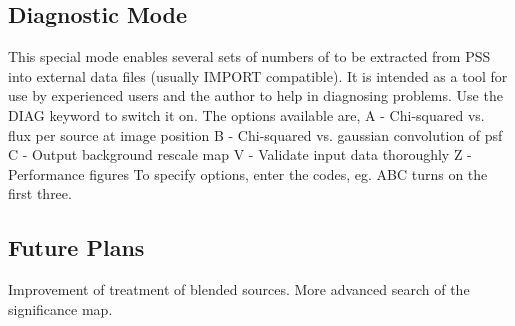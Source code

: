 \documentclass{book}
\renewcommand{\_}{{\tt\char'137}}     %
\begin{document}
\subsection{Diagnostic Mode}
This special mode enables several sets of numbers of to be extracted
from PSS into external data files (usually IMPORT compatible). It is
intended as a tool for use by experienced users and the author to
help in diagnosing problems. Use the DIAG keyword to switch it on.
The options available are,
A - Chi-squared vs. flux per source at image position
B - Chi-squared vs. gaussian convolution of psf
C - Output background rescale map
V - Validate input data thoroughly
Z - Performance figures
To specify options, enter the codes, eg. ABC turns on the first three.
\subsection{Future Plans}
Improvement of treatment of blended sources. More advanced search
of the significance map.
\end{document}
